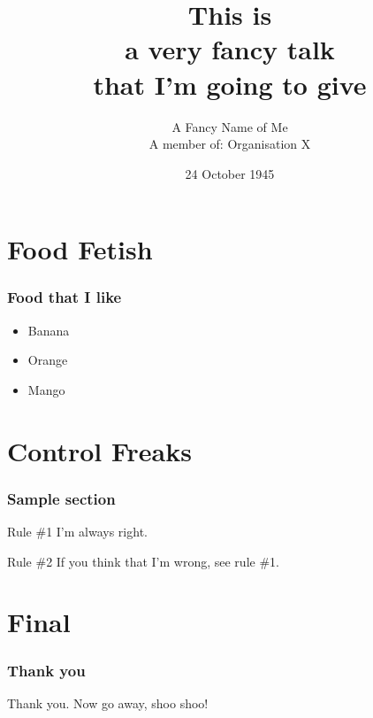 \documentclass[]{beamer}
\title[My short fancy talk]{{\smaller This is} \\a very fancy talk \\ {\smaller that I'm going to give}}
\date[1945-10-24]{24 October 1945}
\author[Me]{A Fancy Name of Me\\{\small A member of: Organisation X}}
\institute[]{Address line 1\\
Address line 2
}
\begin{document}
\begin{frame}
\titlepage
\end{frame}

\section{Food Fetish}

\begin{frame}
\frametitle{Food that I like}
\begin{itemize}
\item Banana
\pause \item Orange
\pause \item Mango
\end{itemize}

\end{frame}

\section{Control Freaks}

\begin{frame}
\frametitle{Sample section}

\begin{block}{Rule \#1}
I'm always right.
\end{block}
\pause %
\begin{block}{Rule \#2}
If you think that I'm wrong, see rule \#1.
\end{block}

\end{frame}

\section{Final}

\begin{frame}\frametitle{Thank you}
\begin{center}   \huge Thank you. 
Now go away, shoo shoo!
\end{center}
\end{frame}
\end{document}
